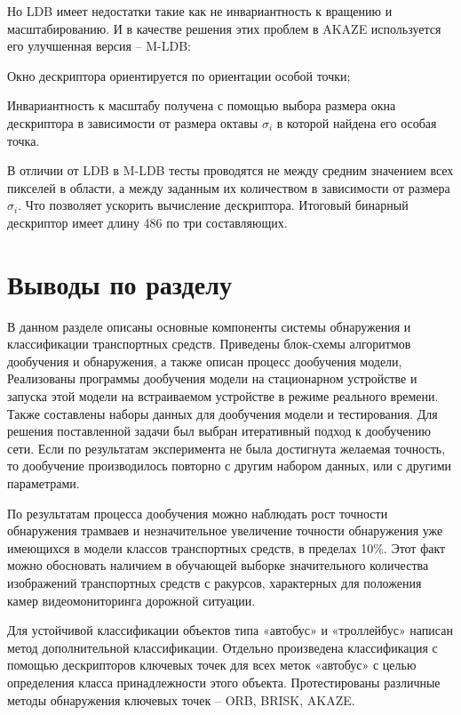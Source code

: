 Но LDB имеет недостатки такие как не инвариантность к вращению и масштабированию. И в качестве решения этих проблем в AKAZE используется его улучшенная версия – M-LDB:
%
\begin{itemize*}
  \item Окно дескриптора ориентируется по ориентации особой точки;
  \item Инвариантность к масштабу получена с помощью выбора размера окна дескриптора в зависимости от размера октавы \(\sigma_i\) в которой найдена его особая точка.
\end{itemize*}
%

В отличии от LDB в M-LDB тесты проводятся не между средним значением всех пикселей в области, а между заданным их количеством в зависимости от размера \(\sigma_i\). Что позволяет ускорить вычисление дескриптора. Итоговый бинарный дескриптор имеет длину 486 по три составляющих.

\section{Выводы по разделу}

В данном разделе описаны основные компоненты системы обнаружения и классификации транспортных средств. Приведены блок-схемы алгоритмов дообучения и обнаружения, а также описан процесс дообучения модели, Реализованы программы дообучения модели на стационарном устройстве и запуска этой модели на встраиваемом устройстве в режиме реального времени. Также составлены наборы данных для дообучения модели и тестирования. Для решения поставленной задачи был выбран итеративный подход к дообучению сети. Если по результатам эксперимента не была достигнута желаемая точность, то дообучение производилось повторно с другим набором данных, или с другими параметрами. 

По результатам процесса дообучения можно наблюдать рост точности обнаружения трамваев и незначительное увеличение точности обнаружения уже имеющихся в модели классов транспортных средств, в пределах 10\%. Этот факт можно обосновать наличием в обучающей выборке значительного количества изображений транспортных средств с ракурсов, характерных для положения камер видеомониторинга дорожной ситуации. 

Для устойчивой классификации объектов типа «автобус» и «троллейбус» написан метод дополнительной классификации. Отдельно произведена классификация с помощью дескрипторов ключевых точек для всех меток «автобус» с целью определения класса принадлежности этого объекта. Протестированы различные методы обнаружения ключевых точек – ORB, BRISK, AKAZE.


